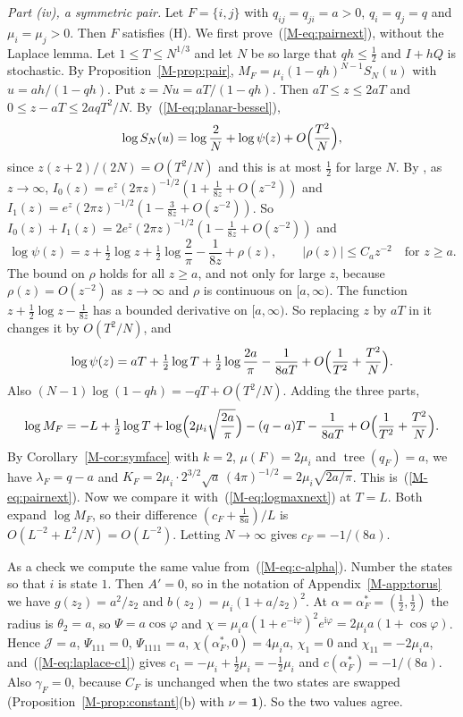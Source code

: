 \documentclass[EJP,preprint]{ejpecp}
\newcommand{\mref}[1]{\ref*{M-#1}}
\newcommand{\meqref}[1]{(\mref{#1})}
\newcommand{\ones}{\mathbf{1}}
\newcommand{\tree}{\operatorname{tree}}
\begin{document}
\emph{Part \textup{(iv)}, a symmetric pair.} Let $F=\{i,j\}$ with
$q_{ij}=q_{ji}=a>0$, $q_i=q_j=q$ and $\mu_i=\mu_j>0$. Then $F$ satisfies (H).
We first prove~\meqref{eq:pairnext}, without the Laplace lemma. Let
$1\le T\le N^{1/3}$ and let $N$ be so large that $qh\le\frac12$ and $I+hQ$ is
stochastic. By Proposition~\mref{prop:pair}, $M_F=\mu_i(1-qh)^{N-1}S_N(u)$ with
$u=ah/(1-qh)$. Put $z=Nu=aT/(1-qh)$. Then $aT\le z\le2aT$ and
$0\le z-aT\le2aqT^2/N$. By~\meqref{eq:planar-bessel},
\[
\log S_N(u)=\log\frac2N+\log\psi(z)+O\Bigl(\frac{T^2}N\Bigr),
\]
since $z(z+2)/(2N)=O(T^2/N)$ and this is at most $\frac12$ for large $N$. By
\cite[Eq.~10.40.1]{dlmf}, as $z\to\infty$,
$I_0(z)=e^z(2\pi z)^{-1/2}(1+\frac1{8z}+O(z^{-2}))$ and
$I_1(z)=e^z(2\pi z)^{-1/2}(1-\frac3{8z}+O(z^{-2}))$. So
$I_0(z)+I_1(z)=2e^z(2\pi z)^{-1/2}(1-\frac1{8z}+O(z^{-2}))$ and
\[
\log\psi(z)=z+\tfrac12\log z+\tfrac12\log\frac2\pi-\frac1{8z}+\rho(z),
\qquad|\rho(z)|\le C_az^{-2}\quad\text{for }z\ge a .
\]
The bound on $\rho$ holds for all $z\ge a$, and not only for large $z$,
because $\rho(z)=O(z^{-2})$ as $z\to\infty$ and $\rho$ is continuous on $[a,\infty)$. The function
$z+\frac12\log z-\frac1{8z}$ has a bounded derivative on $[a,\infty)$. So
replacing $z$ by $aT$ in it changes it by $O(T^2/N)$, and
\[
\log\psi(z)=aT+\tfrac12\log T+\tfrac12\log\frac{2a}\pi-\frac1{8aT}
+O\Bigl(\frac1{T^2}+\frac{T^2}N\Bigr).
\]
Also $(N-1)\log(1-qh)=-qT+O(T^2/N)$. Adding the three parts,
\[
\log M_F=-L+\tfrac12\log T+\log\Bigl(2\mu_i\sqrt{\frac{2a}\pi}\Bigr)-(q-a)T
-\frac1{8aT}+O\Bigl(\frac1{T^2}+\frac{T^2}N\Bigr).
\]
By Corollary~\mref{cor:symface} with $k=2$, $\mu(F)=2\mu_i$ and
$\tree(q_F)=a$, we have $\lambda_F=q-a$ and
$K_F=2\mu_i\cdot2^{3/2}\sqrt a\,(4\pi)^{-1/2}=2\mu_i\sqrt{2a/\pi}$. This
is~\meqref{eq:pairnext}. Now we compare it with~\meqref{eq:logmaxnext} at
$T=L$. Both expand $\log M_F$, so their difference
$(c_F+\frac1{8a})/L$ is $O(L^{-2}+L^2/N)=O(L^{-2})$. Letting
$N\to\infty$ gives $c_F=-1/(8a)$.

As a check we compute the same value from~\meqref{eq:c-alpha}. Number the
states so that $i$ is state $1$. Then $A'=0$, so in the notation of
Appendix~\mref{app:torus} we have $g(z_2)=a^2/z_2$ and
$b(z_2)=\mu_i(1+a/z_2)^2$. At $\alpha=\alpha^*_F=(\frac12,\frac12)$ the radius
is $\theta_2=a$, so $\Psi=a\cos\varphi$ and
$\chi=\mu_ia(1+e^{-\mathrm i\varphi})^2e^{\mathrm i\varphi}
=2\mu_ia(1+\cos\varphi)$. Hence $\mathcal J=a$, $\Psi_{111}=0$,
$\Psi_{1111}=a$, $\chi(\alpha^*_F,0)=4\mu_ia$, $\chi_1=0$ and
$\chi_{11}=-2\mu_ia$, and~\meqref{eq:laplace-c1} gives
$c_1=-\mu_i+\frac12\mu_i=-\frac12\mu_i$ and $c(\alpha^*_F)=-1/(8a)$. Also
$\gamma_F=0$, because $C_F$ is unchanged when the two states are swapped
(Proposition~\mref{prop:constant}(b) with $\nu=\ones$). So the two values
agree.
\end{document}
